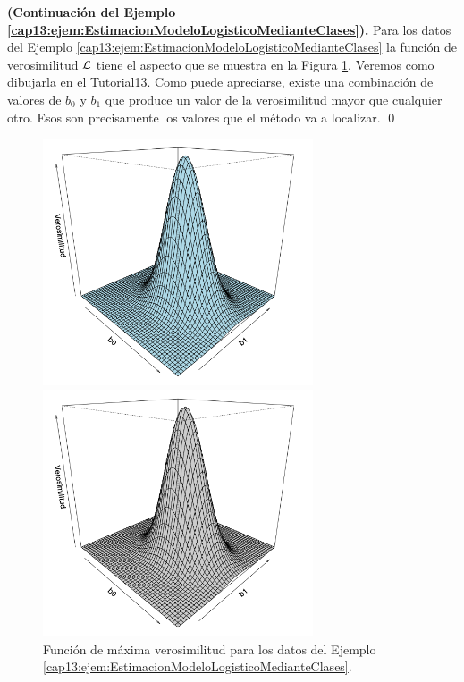 \begin{ejemplo}
\label{cap06:ejem:FuncionMaximaVerosimilitud}
{\bf (Continuación del Ejemplo \ref{cap13:ejem:EstimacionModeloLogisticoMedianteClases}).}	
Para los datos del Ejemplo \ref{cap13:ejem:EstimacionModeloLogisticoMedianteClases} la función de verosimilitud  $\cal L$ tiene el aspecto que se muestra en la Figura \ref{cap06:fig:FuncionMaximaVerosimilitud}.  Veremos como dibujarla en el Tutorial13. Como puede apreciarse, existe una combinación de valores de $b_0$ y $b_1$ que produce un valor de la verosimilitud mayor que cualquier otro. Esos son precisamente los valores que el método va a  localizar. \qed

\begin{figure}[bth]
\begin{center}
\begin{enColor}
\includegraphics[width=8cm]{../fig/Cap13-EjemploFuncionVerosimilitud.png}
\end{enColor}
\begin{bn}
\includegraphics[width=8cm]{../fig/Cap13-EjemploFuncionVerosimilitud-bn.png}
\end{bn}
\caption{Función de máxima verosimilitud para los datos del Ejemplo \ref{cap13:ejem:EstimacionModeloLogisticoMedianteClases}.}
\label{cap06:fig:FuncionMaximaVerosimilitud}
\end{center}
\end{figure}
\end{ejemplo}

